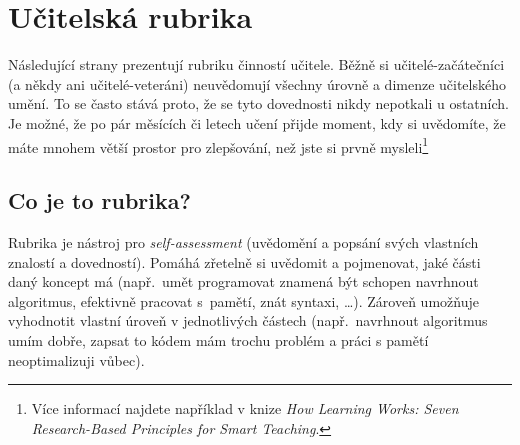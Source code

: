 
\newcommand{\rubriccriterion}[4]{
\stepcounter{rubricquestion}
\section*{\therubricquestion: #1}

\smallskip
\note{Neznalý:} #2

\note{Začátečník:} #3

\note{Guru:} #4

\medskip
\begin{tikzpicture}
\draw (0,0) -- (8,0);
\foreach \i in {0,1,...,8} %
{
\fill[black] (\i,0) circle (1.5 mm);
\fill[white] (\i,0) circle (1.4 mm);
}
\node at (0.15, -0.5) {neznalý};
\node at (3, -0.5)    {začátečník};
\node at (8, -0.5)    {guru};
\end{tikzpicture}
}

\restoregeometry
\chapter*{Učitelská rubrika}
\label{rubric}

Následující strany prezentují rubriku činností učitele. Běžně si učitelé-začátečníci (a někdy ani učitelé-veteráni) neuvědomují všechny úrovně a dimenze učitelského umění. To se často stává proto, že se tyto dovednosti nikdy nepotkali u ostatních. Je možné, že po pár měsících či letech učení přijde moment, kdy si uvědomíte, že máte mnohem větší prostor pro zlepšování, než jste si prvně mysleli\footnote{Více informací najdete například v knize \emph{How Learning Works: Seven Research-Based Principles for Smart Teaching}.}

\section*{Co je to rubrika?}

Rubrika je nástroj pro \emph{self-assessment} (uvědomění a popsání svých vlastních znalostí a dovedností). Pomáhá zřetelně si uvědomit a pojmenovat, jaké části daný koncept má (např.\ umět programovat znamená být schopen navrhnout algoritmus, efektivně pracovat s~pamětí, znát syntaxi, \dots). Zároveň umožňuje vyhodnotit vlastní úroveň v jednotlivých částech (např.\ navrhnout algoritmus umím dobře, zapsat to kódem mám trochu problém a práci s pamětí neoptimalizuji vůbec).

